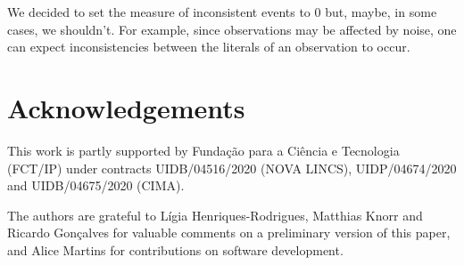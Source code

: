 \documentclass{article}
\begin{document}
We decided to set the measure of inconsistent events to $0$ but,
maybe, in some cases, we shouldn't.  For example, since observations
may be affected by noise, one can expect inconsistencies between the
literals of an observation to occur.
%
%
%
\section*{Acknowledgements}
%
%
%
This work is partly supported by Funda\c{c}\~ao para a Ci\^{e}ncia e
Tecnologia (FCT/IP) under contracts UIDB/04516/2020 (NOVA LINCS),
UIDP/04674/2020 and UIDB/04675/2020 (CIMA).

The authors are grateful to Lígia Henriques-Rodrigues, Matthias Knorr
and Ricardo Gonçalves for valuable comments on a preliminary version
of this paper, and Alice Martins for contributions on software
development.
%
%


%
%
\appendix
%
%
%
\end{document}
